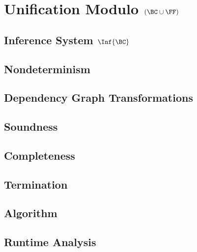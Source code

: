 \chapter{Unification Modulo \texorpdfstring{$(\BC \cup \FF)$}{(BC U F)}}\label{chap:unif-bcuh}

\section{Inference System \texorpdfstring{$\Inf{\BC}$}{IBC}}\label{sec:inf-bc}

\section{Nondeterminism}\label{sec:nondet}

\section{Dependency Graph Transformations}\label{sec:dep-graph-trans}

\section{Soundness}\label{sec:bc-soundness}

\section{Completeness}\label{sec:bc-completeness}

\section{Termination}\label{sec:bc-termination}

\section{Algorithm}\label{sec:bc-algorithm}

\section{Runtime Analysis}\label{sec:bc-runtime-analysis}

